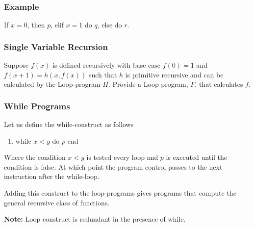 \documentclass{beamer}
\begin{document}
\begin{frame}
	\frametitle{Example}

	If $x = 0$, then $p$, elif $x = 1$ do $q$, else do $r$. 
	


	\vspace{7cm}

	
\end{frame}


\begin{frame}
	\frametitle{Single Variable Recursion}

	Suppose $f(x)$ is defined recursively with base case $f(0) = 1$ and $f(x+1) = h(x,f(x))$ such that $h$ is primitive recursive and can be calculated by the Loop-program $H$. Provide a Loop-program, $F$, that calculates $f$. 

	\vspace{6cm}

\end{frame}

\begin{frame}
	\frametitle{While Programs}

	Let us define the while-construct as follows

	\begin{enumerate}
		\item[] while $x < y$ do $p$ end
	\end{enumerate}

	Where the condition $x < y$ is tested every loop and $p$ is executed until the condition is false. At which point the program control passes to the next instruction after the while-loop.

	\vspace{0.5cm}

	Adding this construct to the loop-programs gives programs that compute the general recursive class of functions. 

	\vspace{0.5cm}

	{\bf Note:} Loop construct is redundant in the presence of while.
	\vspace{3cm}


\end{frame}
\end{document}
